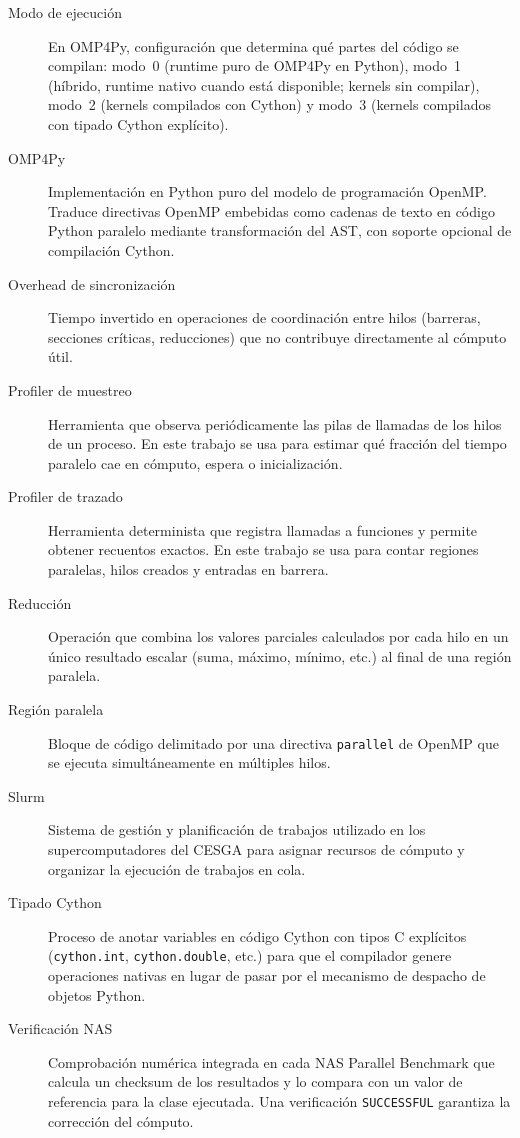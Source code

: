 \begin{description}
  \item[Modo de ejecución] En OMP4Py, configuración que determina qué partes
        del código se compilan: modo~0 (runtime puro de OMP4Py en Python),
        modo~1 (híbrido, runtime nativo cuando está disponible; kernels sin
        compilar), modo~2 (kernels compilados con Cython) y modo~3 (kernels
        compilados con tipado Cython explícito).

  \item[OMP4Py] Implementación en Python puro del modelo de programación
        OpenMP. Traduce directivas OpenMP embebidas como cadenas de texto en
        código Python paralelo mediante transformación del AST, con soporte
        opcional de compilación Cython.

  \item[Overhead de sincronización] Tiempo invertido en operaciones de
        coordinación entre hilos (barreras, secciones críticas, reducciones)
        que no contribuye directamente al cómputo útil.

  \item[Profiler de muestreo] Herramienta que observa periódicamente las pilas
        de llamadas de los hilos de un proceso. En este trabajo se usa para
        estimar qué fracción del tiempo paralelo cae en cómputo, espera o
        inicialización.

  \item[Profiler de trazado] Herramienta determinista que registra llamadas a
        funciones y permite obtener recuentos exactos. En este trabajo se usa
        para contar regiones paralelas, hilos creados y entradas en barrera.

  \item[Reducción] Operación que combina los valores parciales calculados por
        cada hilo en un único resultado escalar (suma, máximo, mínimo, etc.)
        al final de una región paralela.

  \item[Región paralela] Bloque de código delimitado por una directiva
        \texttt{parallel} de OpenMP que se ejecuta simultáneamente en
        múltiples hilos.

  \item[Slurm] Sistema de gestión y planificación de trabajos utilizado en
        los supercomputadores del CESGA para asignar recursos de cómputo y
        organizar la ejecución de trabajos en cola.

  \item[Tipado Cython] Proceso de anotar variables en código Cython con tipos
        C explícitos (\texttt{cython.int}, \texttt{cython.double}, etc.) para
        que el compilador genere operaciones nativas en lugar de pasar por el
        mecanismo de despacho de objetos Python.

  \item[Verificación NAS] Comprobación numérica integrada en cada NAS
        Parallel Benchmark que calcula un checksum de los resultados y lo
        compara con un valor de referencia para la clase ejecutada.
        Una verificación \texttt{SUCCESSFUL} garantiza la corrección del
        cómputo.

\end{description}
